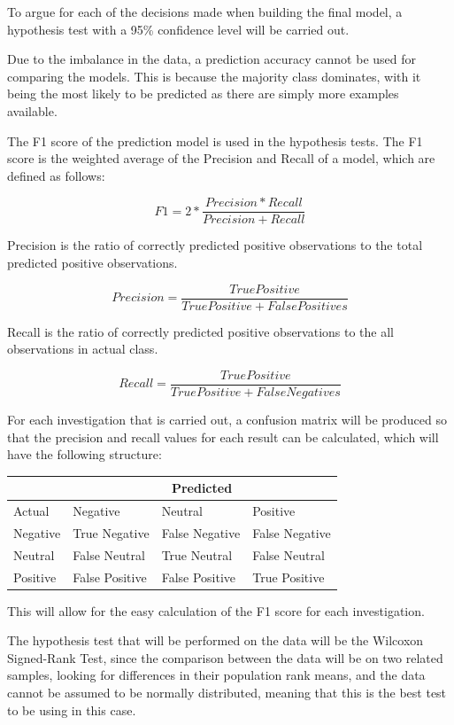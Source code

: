 To argue for each of the decisions made when building the final model, a hypothesis test with a 95\% confidence level will be carried out.

Due to the imbalance in the data, a prediction accuracy cannot be used for comparing the models. This is because the majority class dominates, with it being the most likely to be predicted as there are simply more examples available. \cite{al2015applied} 

The F1 score of the prediction model is used in the hypothesis tests. The F1 score is the weighted average of the Precision and Recall of a model, which are defined as follows: 

$$ F1 = 2 * \frac{Precision * Recall}{Precision + Recall} $$

Precision is the ratio of correctly predicted positive observations to the total predicted positive observations.

$$ Precision = \frac{True Positive}{True Positive + False Positives} $$

Recall is the ratio of correctly predicted positive observations to the all observations in actual class. 

$$ Recall = \frac{True Positive}{True Positive + False Negatives} $$

For each investigation that is carried out, a confusion matrix will be produced so that the precision and recall values for each result can be calculated, which will have the following structure: 



\begin{center}
\begin{tabular}{ |p{3cm}|p{3cm}|p{3cm}|p{3cm}| }
 \hline
  & \multicolumn{3}{|c|}{Predicted} \\
 \hline
   Actual & Negative & Neutral & Positive\\
    \hline
    Negative &  True Negative   &  False Negative  & False Negative\\
    Neutral & False Neutral & True Neutral&  False Neutral \\
    Positive & False Positive & False Positive &  True Positive\\
 \hline
\end{tabular}

\end{center}
This will allow for the easy calculation of the F1 score for each investigation.


The hypothesis test that will be performed on the data will be the Wilcoxon Signed-Rank Test, since the comparison between the data will be on two related samples, looking for differences in their population rank means, and the data cannot be assumed to be normally distributed, meaning that this is the best test to be using in this case. \cite{wilcoxon1970critical}



